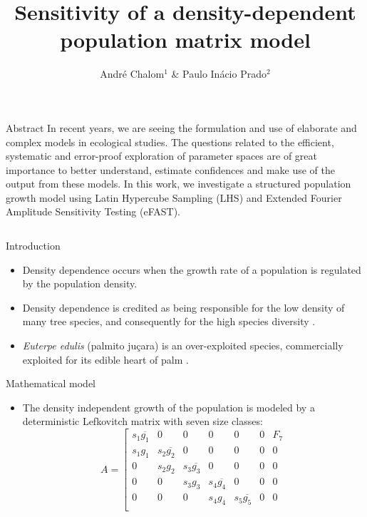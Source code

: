 \documentclass[final]{beamer}
\title{Sensitivity of a density-dependent population matrix model}
\author{Andr\'e Chalom$^1$ \& Paulo In\'acio Prado$^2$}
\institute{$^1$ Programa Interunidades de Pós-Graduação em Bioinformática, 
 $^2$ Instituto de Biociências, Universidade de São Paulo, Brasil.}
\begin{document}
  \begin{frame}{} 
    \vfill
    \begin{block}{\large Abstract}
In recent years, we are seeing the formulation and use of
elaborate and complex models in ecological studies.
The questions related to the efficient, systematic and error-proof
exploration of parameter spaces are of great importance to better understand,
estimate confidences and make use of the output from these models. 
In this work,
we investigate a structured population growth model
using Latin Hypercube Sampling (LHS) and Extended Fourier Amplitude Sensitivity
Testing (eFAST).
    \end{block}
    \vfill
    \begin{columns}[t]
      \begin{column}{.48\linewidth}
        \begin{block}{Introduction}
          \begin{itemize}
		  \item Density dependence occurs when the growth rate of a population is regulated by the population density.
          \item Density dependence is credited as being responsible for the low density of many tree species, and consequently for the high species diversity \cite{Connel71, Janzen70}.
          \item {\em Euterpe edulis} (palmito ju\c cara) is an over-exploited species, commercially exploited for its edible heart of palm \cite{Pollak95}.
          \end{itemize}
        \end{block}
    \vfill
        \begin{block}{Mathematical model}
          \begin{itemize}
          \item The density independent growth of the population is modeled by a deterministic Lefkovitch matrix with seven size classes:
\begin{equation}
A = \left[
\begin{array} {ccccccc}
s_1  \overline{g_1} &   0 &   0 &   0 &   0 &   0 & F_7 \\
s_1  g_1 & s_2  \overline{g_2} &   0 &   0 &   0 &   0 &   0 \\
0 & s_2  g_2 & s_3  \overline{g_3} &   0 &   0 &   0 &   0 \\
0 &   0 & s_3  g_3 & s_4  \overline{g_4} &   0 &   0 &   0 \\
0 &   0 &   0 & s_4  g_4 & s_5  \overline{g_5} &   0 &   0 \\

\end{array}
\end{equation}
\end{itemize}
\end{block}
\end{column}
\end{columns}
\end{frame}
\end{document}
